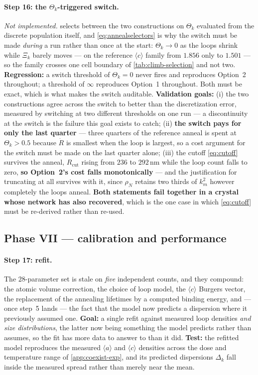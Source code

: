 \documentclass{article}
\newcommand{\aloop}{\ensuremath{\langle a\rangle}}
\newcommand{\cloop}{\ensuremath{\langle c\rangle}}
\begin{document}
\paragraph{Step 16: the $\Theta_k$-triggered switch.} \emph{Not implemented.}
 selects between the two constructions on $\Theta_k$
evaluated from the discrete population itself, and \cref{eq:annealselectors} is
why the switch must be made \emph{during} a run rather than once at the start:
$\Theta_k\to0$ as the loops shrink while $\Xi_k$ barely moves --- on the reference
\cloop{} family from $1.856$ only to $1.501$ --- so the family crosses one cell
boundary of \cref{tab:climb-selection} and not two.
\textbf{Regression:} a switch threshold of $\Theta_k=0$ never fires and
reproduces Option~2 throughout; a threshold of $\infty$ reproduces Option~1
throughout. Both must be exact, which is what makes the switch auditable.
\textbf{Validation goals:} (i) the two constructions agree across the switch to
better than the discretization error, measured by switching at two different
thresholds on one run --- a discontinuity at the switch is the failure this goal
exists to catch; (ii) \textbf{the switch pays for only the last quarter} ---
three quarters of the reference anneal is spent at $\Theta_k>0.5$ because
$\dot R$ is smallest when the loop is largest, so a cost argument for the switch
must be made on the last quarter alone; (iii) the cutoff \cref{eq:cutoff} survives
the anneal, $R_{\mathrm{cut}}$ rising from $236$ to $292\,$nm while the loop count
falls to zero, \textbf{so Option~2's cost falls monotonically} --- and the
justification for truncating at all survives with it, since $\rho_N$ retains two
thirds of $k^2_m$ however completely the loops anneal. \textbf{Both statements
fail together in a crystal whose network has also recovered}, which is the one
case in which \cref{eq:cutoff} must be re-derived rather than re-used.

\subsection{Phase VII --- calibration and performance}

\paragraph{Step 17: refit.} The $28$-parameter set is stale on \emph{five}
independent counts, and they compound: the atomic volume correction, the choice
of loop model, the \cloop{} Burgers vector, the replacement of the annealing
lifetimes by a computed binding energy, and --- once step~5 lands --- the fact
that the model now predicts a dispersion where it previously assumed one.
\textbf{Goal:} a single refit against measured loop densities \emph{and size
distributions}, the latter now being something the model predicts rather than
assumes, so the fit has more data to answer to than it did. \textbf{Test:} the
refitted model reproduces the measured \aloop{} and \cloop{} densities across the
dose and temperature range of \cref{app:coexist-exp}, and its predicted
dispersions $\Delta_k$ fall inside the measured spread rather than merely near the
mean.
\end{document}
